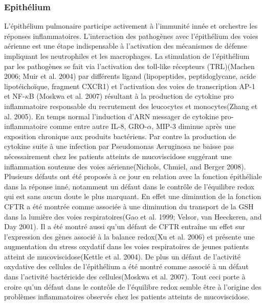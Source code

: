 			\subsubsection{Epithélium}
L’épithélium pulmonaire participe activement à l’immunité innée et orchestre les réponses inflammatoires. L’interaction des pathogènes avec l’épithélium des voies aérienne est une étape indispensable à l’activation des mécanismes de défense impliquant les neutrophiles et les macrophages. La stimulation de l’épithélium par les pathogènes se fait via l’activation des toll-like récepteurs (TRL)(Machen 2006; Muir et al. 2004)\cite{machen_innate_2006}\cite{muir_toll-like_2004} par différents ligand (lipopeptides, peptidoglycane, acide lipotéichoïque, fragment CXCR1) et l’activation des voies de transcription AP-1 et NF-$\kappa$B (Moskwa et al. 2007)\cite{moskwa_novel_2007} résultant à la production de cytokine pro inflammatoire responsable du recrutement des leucocytes et monocytes(Zhang et al. 2005)\cite{zhang_human_2005}. 
En temps normal l’induction d’ARN messager de cytokine pro-inflammatoire comme entre autre IL-8, GRO-$\alpha$, MIP-3 diminue après une exposition chronique aux produits bactériens. Par contre la production de cytokine suite à une infection par Pseudomonas Aeruginosa ne baisse pas nécessairement chez les patients atteints de mucoviscidose suggérant une inflammation soutenue des voies aérienne(Nichols, Chmiel, and Berger 2008)\cite{nichols_chronic_2008}.
Plusieurs défauts ont été proposés à ce jour en relation avec la fonction épithéliale dans la réponse inné, notamment un défaut dans le contrôle de l’équilibre redox qui est sans aucun doute le plus marquant. En effet une diminution de la fonction CFTR a été montrée comme associée à une diminution du transport de la GSH dans la lumière des voies respiratoires(Gao et al. 1999; Velsor, van Heeckeren, and Day 2001)\cite{gao_abnormal_1999}\cite{velsor_antioxidant_2001}. Il a été montré aussi qu’un défaut de CFTR entraîne un effet sur l’expression des gènes associé à la balance redox(Xu et al. 2006)\cite{xu_functional_2006} et présente une augmentation du stress oxydatif dans les voies respiratoires de jeunes patients atteint de mucoviscidose(Kettle et al. 2004)\cite{kettle_myeloperoxidase_2004}. De plus un défaut de l’activité oxydative des cellules de l’épithélium a été montré comme associé à un défaut dans l’activité bactéricide des cellules(Moskwa et al. 2007)\cite{moskwa_novel_2007}. Tout ceci porte à croire qu’un défaut dans le contrôle de l’équilibre redox semble être à l’origine des problèmes inflammatoires observés chez les patients atteints de mucoviscidose.




